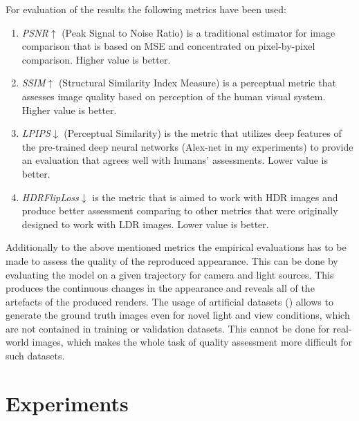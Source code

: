 For evaluation of the results the following metrics have been used:
\begin{enumerate}
    \item \textit{PSNR}$\uparrow$ \cite{hore2010image} (Peak Signal to Noise Ratio) is a traditional estimator for image comparison
    that is based on MSE and concentrated on pixel-by-pixel comparison.
    Higher value is better.
    \item \textit{SSIM}$\uparrow$ \cite{zhou2004image, nilsson2020understanding, hore2010image} (Structural Similarity Index Measure) is a perceptual metric
    that assesses image quality based on perception of the human visual system.
    Higher value is better.
    \item \textit{LPIPS}$\downarrow$ \cite{zhang2018perceptual} (Perceptual Similarity) is the metric
    that utilizes deep features of the pre-trained deep neural networks (Alex-net \cite{krizhevsky2012imagenet} in my experiments)
    to provide an evaluation that agrees well with humans' assessments.
    Lower value is better.
    \item \textit{HDRFlipLoss}$\downarrow$ \cite{theisel2021hdrflip, andersson2020flip} is the metric
    that is aimed to work with HDR images and produce better assessment comparing to other metrics
    that were originally designed to work with LDR images.
    Lower value is better.
\end{enumerate}

Additionally to the above mentioned metrics the empirical evaluations has to be made
to assess the quality of the reproduced appearance.
This can be done by evaluating the model on a given trajectory for camera and light sources.
This produces the continuous changes in the appearance and reveals all of the artefacts of the produced renders.
The usage of artificial datasets () allows to generate the ground truth images
even for novel light and view conditions, which are not contained in training or validation datasets.
This cannot be done for real-world images, which makes the whole task of quality assessment more difficult for such datasets.


\section{Experiments}


